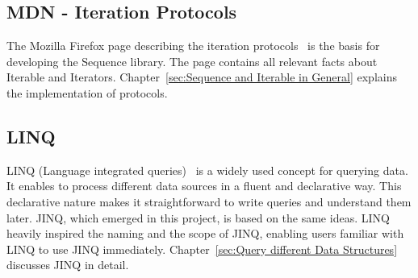 \subsection{MDN - Iteration Protocols}
\label{sub:MDN - Iteration Protocols}
The Mozilla Firefox page describing the iteration
protocols~\cite{mdn_protocols} is the basis for developing the Sequence
library. The page contains all relevant facts about Iterable and Iterators.
Chapter~\ref{sec:Sequence and Iterable in General} explains the implementation
of protocols.

\subsection{LINQ}
\label{sub:LINQ}
LINQ (Language integrated queries)~\cite{billwagner_language-integrated_2023}
is a widely used concept for querying data. It enables to process different
data sources in a fluent and declarative way. This declarative nature makes it
straightforward to write queries and understand them later. JINQ, which emerged
in this project, is based on the same ideas. LINQ heavily inspired the naming
and the scope of JINQ, enabling users familiar with LINQ to use JINQ
immediately. Chapter~\ref{sec:Query different Data Structures} discusses JINQ
in detail.
